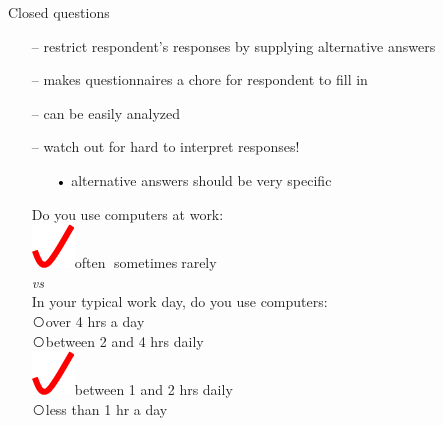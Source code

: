 \documentclass[pdf]{beamer}
\begin{document}
{{{{{{\begin{frame}
    Closed questions
    \begin{itemize}
      \item[\textcolor{black}{--}] restrict respondent’s responses by supplying alternative answers
      \item[\textcolor{black}{--}] makes questionnaires a chore for respondent to fill in
      \item[\textcolor{black}{--}] can be easily analyzed
      \item[\textcolor{black}{--}] watch out for hard to interpret responses!
       \begin{itemize}
      	\item[\textcolor{black}{•}] alternative answers should be very specific
        \end{itemize} 
        \vspace{3mm}
    Do you use computers at work:\\
    {\large\hspace{5mm} \textcircled{\includegraphics[scale = 0.6]{28_30_Imagine.png}}\hspace{2mm}often\hspace{6mm} \textcircled{}\hspace{2mm}sometimes\hspace{6mm}\textcircled{}\hspace{2mm}rarely}\\
    \textit{vs}\\
    In your typical work day,  do you use computers:\\
   {\large\hspace{5mm}\textcircled{}\hspace{2mm}over 4 hrs a day}\\ {\large\hspace{5mm}\textcircled{}\hspace{2mm}between 2 and 4 hrs daily}\\   {\large\hspace{5mm}\textcircled{\includegraphics[scale = 0.6]{28_30_Imagine.png}}\hspace{2mm}between 1 and 2 hrs daily}\\   {\large\hspace{5mm}\textcircled{}\hspace{2mm}less than 1 hr a day}
    \end{itemize}    
\end{frame}



}}}}}}
\end{document}
